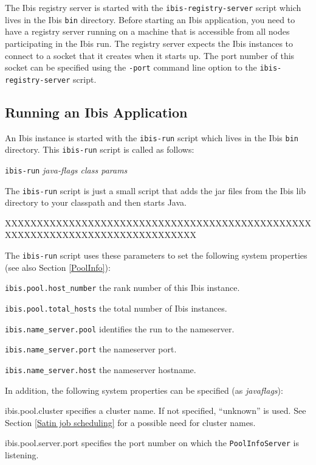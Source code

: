\documentclass[10pt]{article}
\newcommand{\mysubsection}[1]{\subsection{#1}\label{#1}}
\begin{document}
The Ibis registry server is started with the \texttt{ibis-registry-server}
script which lives in the Ibis \texttt{bin} directory.
Before starting an Ibis application,
you need to have a registry server running on a machine that is accessible
from all nodes participating in the Ibis run.
The registry server expects the Ibis instances to connect to a
socket that it creates when it starts up.
The port number of this socket can be specified using the
\texttt{-port} command line option to the \texttt{ibis-registry-server} script.

\mysubsection{Running an Ibis Application}

An Ibis instance is started with the \texttt{ibis-run} script which
lives in the Ibis \texttt{bin} directory.  This \texttt{ibis-run}
script is called as follows:
\begin{center}
\texttt{ibis-run} \emph{java-flags class params}
\end{center}
The \texttt{ibis-run} script is just a small script that adds the jar files
from the Ibis lib directory to your classpath and then starts Java.

XXXXXXXXXXXXXXXXXXXXXXXXXXXXXXXXXXXXXXXXXXXXXXXXXXXXXXXXXXXXXXXXXXXXXXXXXXXXXX

The \texttt{ibis-run} script uses these parameters to set the following
system properties (see also Section \ref{PoolInfo}):
\begin{description}
\item{\texttt{ibis.pool.host\_number}}
the rank number of this Ibis instance.
\item{\texttt{ibis.pool.total\_hosts}}
the total number of Ibis instances.
\item{\texttt{ibis.name\_server.pool}}
identifies the run to the nameserver.
\item{\texttt{ibis.name\_server.port}}
the nameserver port.
\item{\texttt{ibis.name\_server.host}}
the nameserver hostname.
\end{description}

In addition, the following system properties can be specified
(as \emph{javaflags}):
\begin{description}
\item{ibis.pool.cluster}
specifies a cluster name. If not specified,
``unknown'' is used.
See Section \ref{Satin job scheduling} for a possible need for cluster
names.
\item{ibis.pool.server.port}
specifies the port number on which the
\texttt{PoolInfoServer} is listening.
\end{description}
\end{document}
